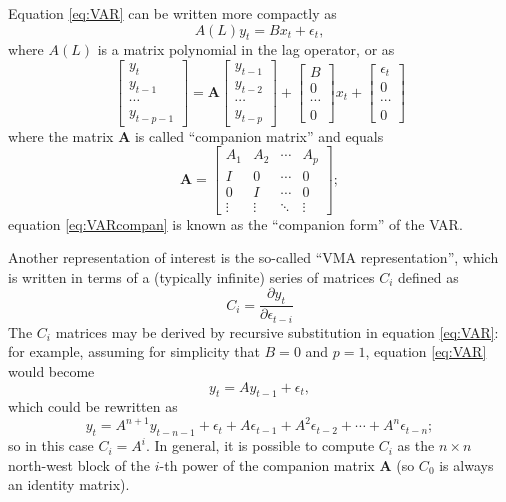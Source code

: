 Equation \eqref{eq:VAR} can be written more compactly as
\begin{equation}
  \label{eq:VARpoly}
  A(L) y_t = B x_t + \epsilon_t ,
\end{equation}
where $A(L)$ is a matrix polynomial in the lag operator, or as
\begin{equation}
  \label{eq:VARcompan}
  \left[\begin{array}{c} y_t \\ y_{t-1} \\ \cdots \\ y_{t-p-1} 
    \end{array} \right] = 
  \mathbf{A}
  \left[\begin{array}{c} y_{t-1} \\ y_{t-2} \\ \cdots \\ y_{t-p} 
    \end{array} \right] +
  \left[\begin{array}{c} B \\ 0 \\ \cdots \\ 0
    \end{array} \right] x_t +
  \left[\begin{array}{c} \epsilon_t \\ 0 \\ \cdots \\ 0 
    \end{array} \right]
\end{equation}
where the matrix $\mathbf{A}$ is called ``companion matrix'' and equals
\[
\mathbf{A} =
  \left[\begin{array}{ccccc} 
      A_1 & A_2 & \cdots & A_p \\ 
      I & 0 & \cdots & 0 \\ 
      0 & I & \cdots & 0 \\ 
      \vdots & \vdots & \ddots & \vdots
    \end{array} \right] ;
\]
equation \eqref{eq:VARcompan} is known as the ``companion form'' of
the VAR.

Another representation of interest is the so-called ``VMA
representation'', which is written in terms of a (typically infinite)
series of matrices $C_i$ defined as
\begin{equation}
  \label{eq:VMA}
  C_i = \frac{\partial y_t}{\partial \epsilon_{t-i}}
\end{equation}
The $C_i$ matrices may be derived by recursive substitution in
equation \eqref{eq:VAR}: for example, assuming for simplicity that
$B=0$ and $p=1$, equation \eqref{eq:VAR} would become
\[
  y_t = A y_{t-1} + \epsilon_t ,
\]
which could be rewritten as
\[
  y_t = A^{n+1} y_{t-n-1} + \epsilon_t + A \epsilon_{t-1} + A^2
  \epsilon_{t-2} + \cdots + A^n \epsilon_{t-n} ;
\]
so in this case $C_i = A^i$. In general, it is possible to compute
$C_i$ as the $n \times n$ north-west block of the $i$-th power of the
companion matrix $\mathbf{A}$ (so $C_0$ is always an identity matrix).

